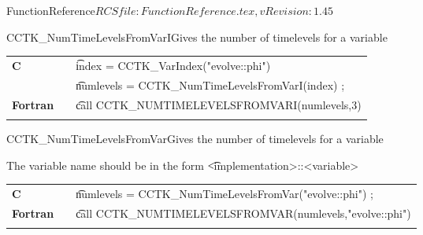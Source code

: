 \begin{cactuspart}{5}{FunctionReference}{$RCSfile: FunctionReference.tex,v $}{$Revision: 1.45 $}
\begin{CCTKFunc}{CCTK\_NumTimeLevelsFromVarI}{Gives the number of timelevels for a variable}
\label{CCTK-NumTimeLevelsFromVarI}
\showargs
\begin{params}
\end{params}
\begin{discussion}
\end{discussion}
\begin{examples}
\begin{tabular}{@{}p{3cm}cp{11cm}}
\hfill {\bf C} && {\t index = CCTK\_VarIndex("evolve::phi")}\\
               &&{\t numlevels = CCTK\_NumTimeLevelsFromVarI(index) ;}
\\
\hfill {\bf Fortran} && {\t call CCTK\_NUMTIMELEVELSFROMVARI(numlevels,3)}\\
\\
\end{tabular}
\end{examples}
\begin{errorcodes}
\end{errorcodes}
\end{CCTKFunc}




\begin{CCTKFunc}{CCTK\_NumTimeLevelsFromVar}{Gives the number of timelevels for a variable}
\label{CCTK-NumTimeLevelsFromVar}
\showargs
\begin{params}
\end{params}
\begin{discussion}
The variable name should be in the form {\t <implementation>::<variable>}
\end{discussion}
\begin{examples}
\begin{tabular}{@{}p{3cm}cp{11cm}}
\hfill {\bf C} && {\t numlevels = CCTK\_NumTimeLevelsFromVar("evolve::phi") ;}
\\
\hfill {\bf Fortran} && {\t call CCTK\_NUMTIMELEVELSFROMVAR(numlevels,"evolve::phi")}\\
\\
\end{tabular}
\end{examples}
\begin{errorcodes}
\end{errorcodes}
\end{CCTKFunc}





\end{cactuspart}

